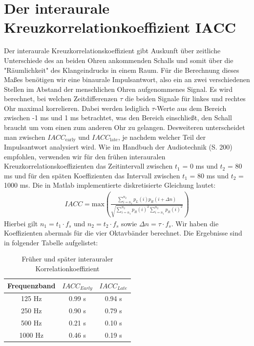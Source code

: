 \section{Der interaurale Kreuzkorrelationkoeffizient $\mathbf{IACC}$}
\label{sec:iacc}

Der interaurale Kreuzkorrelationskoeffizient gibt Auskunft über zeitliche Unterschiede des an beiden Ohren ankommenden Schalls und somit über die "Räumlichkeit" des Klangeindrucks in einem Raum. 
Für die Berechnung dieses Maßes benötigen wir eine binaurale Impulsantwort, also ein an zwei verschiedenen Stellen im Abstand der menschlichen Ohren aufgenommenes Signal. 
Es wird berechnet, bei welchen Zeitdifferenzen $\tau$ die beiden Signale für linkes und rechtes Ohr maximal korrelieren.
Dabei werden lediglich $\tau$-Werte aus dem Bereich zwischen -1 ms und 1 ms betrachtet, was den Bereich einschließt, den Schall braucht um vom einen zum anderen Ohr zu gelangen.  
Desweiteren unterscheidet man zwischen $IACC_{\mathrm{early}}$ und $IACC_{\mathrm{late}}$, je nachdem welcher Teil der Impulsantwort analysiert wird. Wie im Handbuch der Audiotechnik \cite{Weinzierl08} (S. 200) empfohlen, verwenden wir für den frühen interauralen Kreuzkorrelationskoeffizienten das Zeitintervall zwischen $t_1$ = 0 ms und $t_2$ = 80 ms und für den späten Koeffizienten das Intervall zwischen $t_1$ = 80 ms und $t_2$ = 1000 ms. 
Die in Matlab implementierte diskretisierte Gleichung lautet:
\begin{align*}
IACC = \mathrm{max}\left( \frac{\sum_{i=n_1}^{n_2} p_L(i)p_R(i+\Delta n)} {\sqrt{\sum_{i=n_1}^{n_2}p_R(i)^2 \sum_{i=n_1}^{n_2} p_R(i)^2 }}\right) 
\end{align*}
Hierbei gilt $n_1 = t_1 \cdot f_s$ und  $n_2 = t_2 \cdot f_s$ sowie $\Delta n = \tau \cdot f_s$.
Wir haben die Koeffizienten abermals für die vier Oktavbänder berechnet.
Die Ergebnisse sind in folgender Tabelle aufgelistet:
\begin{table}[H]
    \centering
    \caption{Früher und später interauraler Korrelationkoeffizient}
    \label{tab:iacc}
    \begin{tabular}[\textwidth]{|c|c|c|}
    \hline
        Frequenzband & $IACC_{Early}$ &$IACC_{Late}$ \\
        \hline
        125 Hz & 0.99 s & 0.94 s \\
        250 Hz & 0.90 s & 0.79 s \\
        500 Hz & 0.21 s & 0.10 s \\
        1000 Hz & 0.46 s & 0.19 s \\
        \hline
    \end{tabular}
\end{table}

